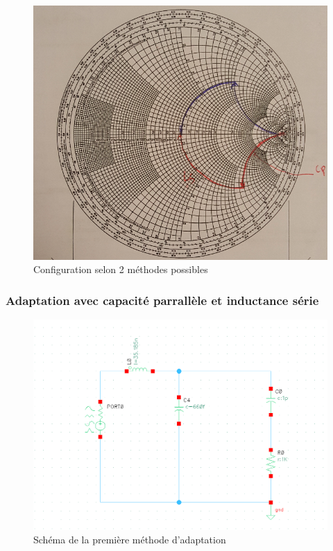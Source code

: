 \documentclass[a4paper]{article}
\begin{document}
\begin{figure}[!htb]
\begin{center}
  \includegraphics[scale=0.5]{adaptation_elements_proposition.png}
  \caption{Configuration selon 2 m\'ethodes possibles}
\end{center}
\end{figure}

\clearpage

\subsubsection{Adaptation avec capacit\'e parrall\`ele et inductance s\'erie}

\begin{figure}[!htb]
\begin{center}
  \includegraphics[scale=0.47]{architecture-Cparalle-Lseries.png}
  \caption{Sch\'ema de la premi\`ere m\'ethode d'adaptation}
\end{center}
\end{figure}
\end{document}
